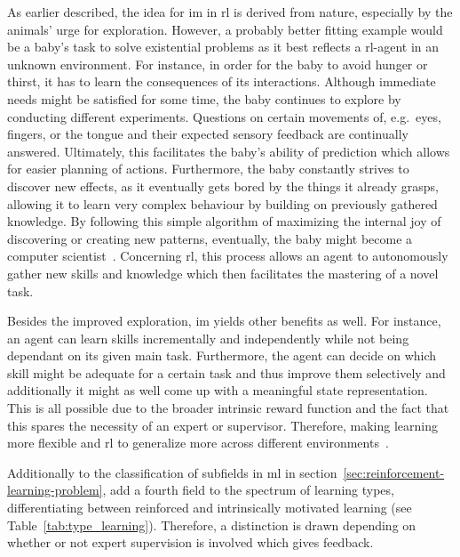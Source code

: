 \documentclass[draft,final]{vutinfth} %
\begin{document}
    As earlier described, the idea for \gls{im} in \gls{rl} is derived from nature, especially by the animals' urge for exploration.
    However, a probably better fitting example would be a baby's task to solve existential problems as it best reflects a \gls{rl}-agent in an unknown environment.
    For instance, in order for the baby to avoid hunger or thirst, it has to learn the consequences of its interactions.
    Although immediate needs might be satisfied for some time, the baby continues to explore by conducting different experiments.
    Questions on certain movements of, e.g.\ eyes, fingers, or the tongue and their expected sensory feedback are continually answered.
    Ultimately, this facilitates the baby's ability of prediction which allows for easier planning of actions.
    Furthermore, the baby constantly strives to discover new effects, as it eventually gets bored by the things it already grasps, allowing it to learn very complex behaviour by building on previously gathered knowledge.
    By following this simple algorithm of maximizing the internal joy of discovering or creating new patterns, eventually, the baby might become a computer scientist~\citep{schmidhuber_formal_2010}.
    Concerning \gls{rl}, this process allows an agent to autonomously gather new skills and knowledge which then facilitates the mastering of a novel task.

    Besides the improved exploration, \gls{im} yields other benefits as well.
    For instance, an agent can learn skills incrementally and independently while not being dependant on its given main task.
    Furthermore, the agent can decide on which skill might be adequate for a certain task and thus improve them selectively and additionally it might as well come up with a meaningful state representation.
    This is all possible due to the broader intrinsic reward function and the fact that this spares the necessity of an expert or supervisor.
    Therefore, making learning more flexible and \gls{rl} to generalize more across different environments~\citep{aubret_survey_2019}.

    Additionally to the classification of subfields in \gls{ml} in section~\ref{sec:reinforcement-learning-problem}, \citeauthor{aubret_survey_2019} add a fourth field to the spectrum of learning types, differentiating between reinforced and intrinsically motivated learning (see Table~\ref{tab:type_learning}).
    Therefore, a distinction is drawn depending on whether or not expert supervision is involved which gives feedback.
\end{document}
